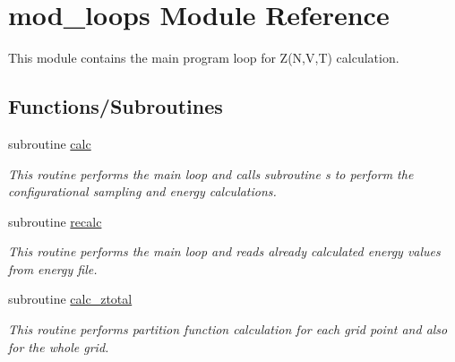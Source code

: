 \hypertarget{namespacemod__loops}{}\section{mod\+\_\+loops Module Reference}
\label{namespacemod__loops}


This module contains the main program loop for Z(\+N,\+V,\+T) calculation.  


\subsection*{Functions/\+Subroutines}
\begin{DoxyCompactItemize}
\item 
subroutine \hyperlink{namespacemod__loops_a6e4de9cf9c585c364502a63d328071bd}{calc}
\begin{DoxyCompactList}\small\item\em This routine performs the main loop and calls subroutine s to perform the configurational sampling and energy calculations. \end{DoxyCompactList}\item 
subroutine \hyperlink{namespacemod__loops_a755c1c6e9232a99181d4ac9a7c0c5cff}{recalc}
\begin{DoxyCompactList}\small\item\em This routine performs the main loop and reads already calculated energy values from energy file. \end{DoxyCompactList}\item 
subroutine \hyperlink{namespacemod__loops_acfec0f16ef59b6277e9dfd13d5026965}{calc\+\_\+ztotal}
\begin{DoxyCompactList}\small\item\em This routine performs partition function calculation for each grid point and also for the whole grid. \end{DoxyCompactList}\end{DoxyCompactItemize}
